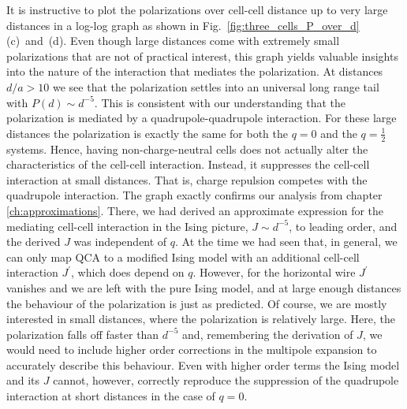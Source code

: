 It is instructive to plot the polarizations over cell-cell distance up to very
large distances in a log-log graph as shown in
Fig.~\ref{fig:three_cells_P_over_d}(c)~and~(d). Even though large distances come
with extremely small polarizations that are not of practical interest, this
graph yields valuable insights into the nature of the interaction that mediates
the polarization. At distances $d/a > 10$ we see that the polarization settles
into an universal long range tail with $P(d) \sim d^{-5}$. This is consistent
with our understanding that the polarization is mediated by a
quadrupole-quadrupole interaction. For these large distances the polarization is
exactly the same for both the $q=0$ and the $q=\frac{1}{2}$ systems. Hence,
having non-charge-neutral cells does not actually alter the characteristics of
the cell-cell interaction. Instead, it suppresses the cell-cell interaction at
small distances. That is, charge repulsion competes with the quadrupole
interaction. The graph exactly confirms our analysis from chapter
\ref{ch:approximations}. There, we had derived an approximate expression for the
mediating cell-cell interaction in the Ising picture, $J \sim d^{-5}$, to
leading order, and the derived $J$ was independent of $q$. At the time we had
seen that, in general, we can only map QCA to a modified Ising model with an
additional cell-cell interaction $J^{\prime}$, which does depend on $q$.
However, for the horizontal wire $J^{\prime}$ vanishes and we are left with the
pure Ising model, and at large enough distances the behaviour of the
polarization is just as predicted. Of course, we are mostly interested in small
distances, where the polarization is relatively large. Here, the polarization
falls off faster than $d^{-5}$ and, remembering the derivation of $J$, we would
need to include higher order corrections in the multipole expansion to
accurately describe this behaviour. Even with higher order terms the Ising model
and its $J$ cannot, however, correctly reproduce the suppression of the
quadrupole interaction at short distances in the case of $q=0$.

